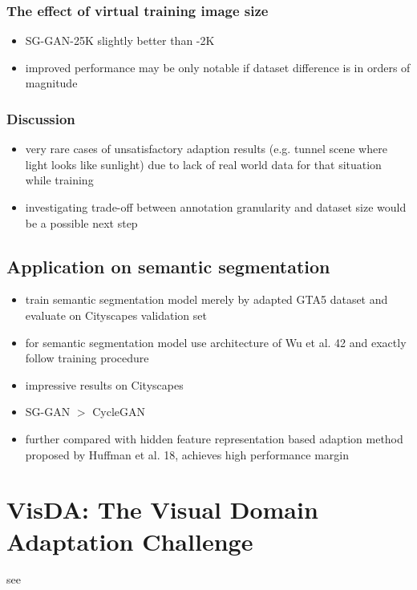 \subsubsection{The effect of virtual training image size}
\begin{itemize}
	\item SG-GAN-25K slightly better than -2K
	\item improved performance may be only notable if dataset difference is in orders of magnitude
\end{itemize}

\subsubsection{Discussion}
\begin{itemize}
	\item very rare cases of unsatisfactory adaption results (e.g. tunnel scene where light looks like sunlight) due to lack of real world data for that situation while training
	\item investigating trade-off between annotation granularity and dataset size would be a possible next step
\end{itemize}

\subsection{Application on semantic segmentation}
\begin{itemize}
	\item train semantic segmentation model merely by adapted GTA5 dataset and evaluate on Cityscapes validation set
	\item for semantic segmentation model use architecture of Wu et al. 42 and exactly follow training procedure
	\item impressive results on Cityscapes 
	\item SG-GAN $>$ CycleGAN
	\item further compared with hidden feature representation based adaption method proposed by Huffman et al. 18, achieves high performance margin
\end{itemize}


\section{VisDA: The Visual Domain Adaptation Challenge}

see \cite{DBLP:journals/corr/abs-1710-06924}


